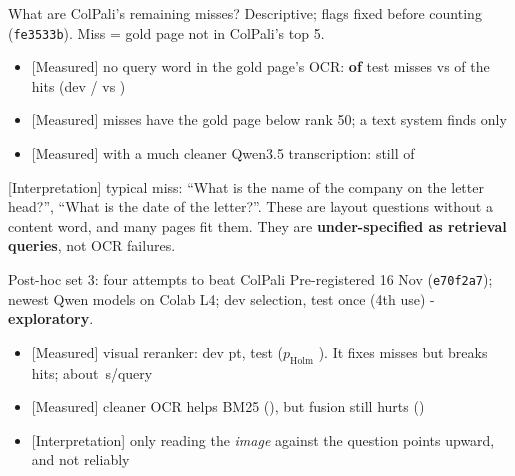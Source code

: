 \documentclass[aspectratio=169,11pt]{beamer}
\newcommand{\lbl}[2]{\textsf{\scriptsize\textcolor{#1}{[#2]}}}
\newcommand{\Mea}{\lbl{bgAqua}{Measured}}
\newcommand{\Int}{\lbl{tagI}{Interpretation}}
\begin{document}
\begin{frame}{What are ColPali's remaining misses?}
\small Descriptive; flags fixed before counting (\texttt{fe3533b}). Miss = gold page not in ColPali's top 5.\\[6pt]
\begin{itemize}
  \item \Mea{} no query word in the gold page's OCR: \textbf{\noOverlapMissTest{} of \missTest{}} test misses vs \noOverlapHitTest{} of the hits (dev \noOverlapMissDev{}/\missDev{} vs \noOverlapHitDev{})
  \item \Mea{} \farMissTest{} misses have the gold page below rank 50; a text system finds only \textFindsTest{}
  \item \Mea{} with a much cleaner Qwen3.5 transcription: still \noOverlapMissVlmTest{} of \missTest{}
\end{itemize}
\vspace{4pt}
\Int{} typical miss: ``What is the name of the company on the letter head?'', ``What is the date of the letter?''. These are layout questions without a content word, and many pages fit them. They are \textbf{under-specified as retrieval queries}, not OCR failures.
\end{frame}

\begin{frame}{Post-hoc set 3: four attempts to beat ColPali}
\small Pre-registered 16 Nov (\texttt{e70f2a7}); newest Qwen models on Colab L4; dev selection, test once (4th use) - \textbf{exploratory}.\\[4pt]
{\scriptsize}
\vspace{2pt}
\begin{itemize}
  \item \Mea{} visual reranker: dev \deltaBvrDevPts{} pt, test \deltaBvr{} ($p_\text{Holm}$ \pHolmBvr{}). It fixes \vrFixedTest{} misses but breaks \vrBrokenTest{} hits; about \vrLatTwenty{}\,s/query
  \item \Mea{} cleaner OCR helps BM25 (\deltaAvlmA{}), but fusion still hurts (\deltaCvlm{})
  \item \Int{} only reading the \emph{image} against the question points upward, and not reliably
\end{itemize}
\end{frame}
\end{document}
